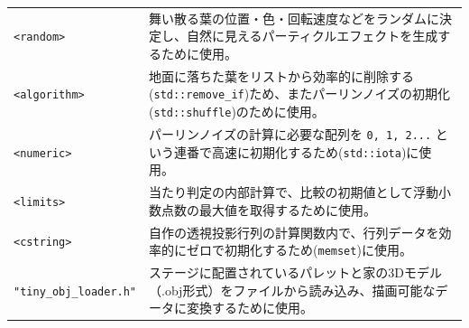 \documentclass[uplatex,dvipdfmx,a4paper]{jsarticle}
\begin{document}
\begin{table}[H]
\begin{tabular}{lp{10cm}}
    \texttt{<random>} & 舞い散る葉の位置・色・回転速度などをランダムに決定し、自然に見えるパーティクルエフェクトを生成するために使用。 \\ \addlinespace
    \texttt{<algorithm>} & 地面に落ちた葉をリストから効率的に削除する(\texttt{std::remove\_if})ため、またパーリンノイズの初期化(\texttt{std::shuffle})のために使用。 \\ \addlinespace
    \texttt{<numeric>} & パーリンノイズの計算に必要な配列を \texttt{0, 1, 2...} という連番で高速に初期化するため(\texttt{std::iota})に使用。 \\ \addlinespace
    \texttt{<limits>} & 当たり判定の内部計算で、比較の初期値として浮動小数点数の最大値を取得するために使用。 \\ \addlinespace
    \texttt{<cstring>} & 自作の透視投影行列の計算関数内で、行列データを効率的にゼロで初期化するため(\texttt{memset})に使用。 \\ \addlinespace
    \texttt{"tiny\_obj\_loader.h"} & ステージに配置されているパレットと家の3Dモデル（.obj形式）をファイルから読み込み、描画可能なデータに変換するために使用。 \\
    \bottomrule
    \end{tabular}
\end{table}

\clearpage
\end{document}
